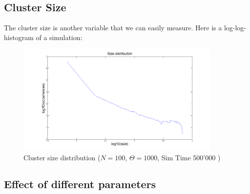 \documentclass[11pt]{article}
\begin{document}
\subsection{Cluster Size}
The cluster size is another variable that we can easily measure. Here is a log-log-histogram of a simulation:
\begin{figure}[H]
\includegraphics[width=0.9\textwidth,keepaspectratio=true]{Pictures/Size_dist_1.png}
\caption{Cluster size distribution ($N=100$, $\Theta= 1000 $, Sim Time 500'000  ) }
\end{figure}

\subsection{Effect of different parameters}
\end{document}
